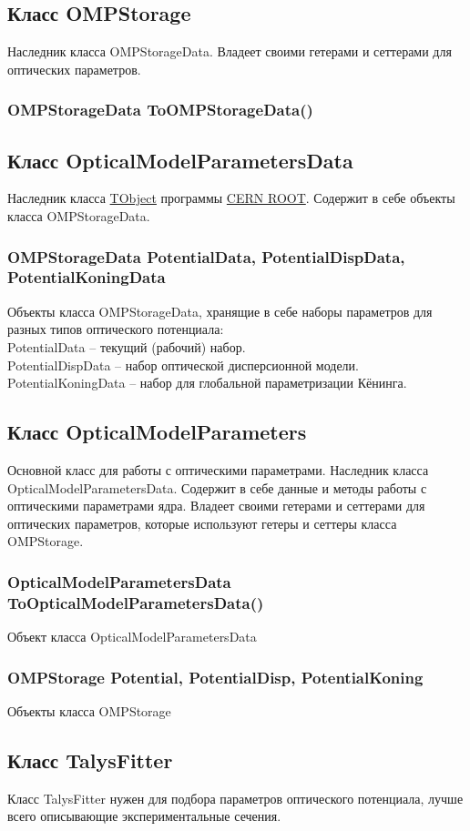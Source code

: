 \documentclass[a4paper,12pt]{extarticle}
\begin{document}
\subsection{Класс OMPStorage}
Наследник класса OMPStorageData. Владеет своими гетерами и сеттерами для оптических параметров.
\subsubsection{OMPStorageData ToOMPStorageData()}

\subsection{Класс OpticalModelParametersData}
Наследник класса \href{https://root.cern/doc/master/classTObject.html}{TObject} программы \href{https://root.cern}{CERN ROOT}. Содержит в себе объекты класса OMPStorageData.
\subsubsection{OMPStorageData PotentialData, PotentialDispData, PotentialKoningData}
Объекты класса OMPStorageData, хранящие в себе наборы параметров для разных типов оптического потенциала:\\
PotentialData -- текущий (рабочий) набор.\\
PotentialDispData -- набор оптической дисперсионной модели.\\
PotentialKoningData -- набор для глобальной параметризации Кёнинга.
\subsection{Класс OpticalModelParameters}
Основной класс для работы с оптическими параметрами. Наследник класса OpticalModelParametersData. Содержит в себе данные и методы работы с оптическими параметрами ядра. Владеет своими гетерами и сеттерами для оптических параметров, которые используют гетеры и сеттеры класса OMPStorage.
\subsubsection{OpticalModelParametersData ToOpticalModelParametersData()}
Объект класса OpticalModelParametersData
\subsubsection{OMPStorage Potential, PotentialDisp, PotentialKoning}
Объекты класса OMPStorage
\subsection{Класс TalysFitter}
Класс TalysFitter нужен для подбора параметров оптического потенциала, лучше всего описывающие экспериментальные сечения. 
\end{document}
